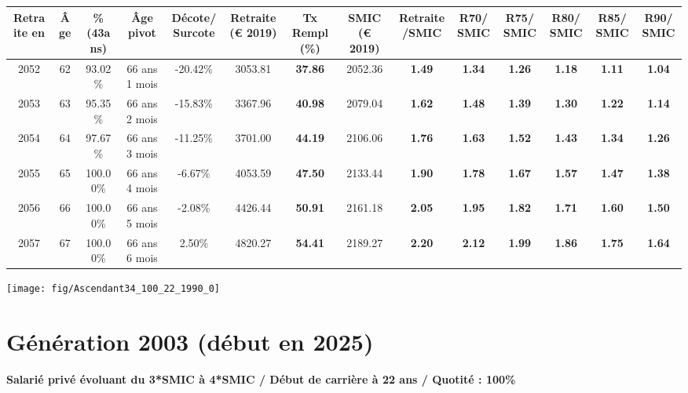 \begin{adjustbox}{max width=\textwidth} 
\begin{tabular}[htb]{|c|c||c|c|c||c|c||c|c||c|c|c|c|c|} 
\hline 
 Retraite en &  Âge &  \%(43ans) &  Âge pivot &  Décote/Surcote &  Retraite (\euro{} 2019) &  Tx Rempl(\%) &  SMIC (\euro{} 2019) &  Retraite/SMIC &  R70/SMIC &  R75/SMIC &  R80/SMIC &  R85/SMIC &  R90/SMIC \\ 
\hline \hline 
 2052 &  62 &  93.02\% &  66 ans 1 mois &  -20.42\% &  3053.81 &  {\bf 37.86} &  2052.36 &  {\bf 1.49} &  {\bf 1.34} &  {\bf 1.26} &  {\bf 1.18} &  {\bf 1.11} &  {\bf 1.04} \\ 
\hline 
 2053 &  63 &  95.35\% &  66 ans 2 mois &  -15.83\% &  3367.96 &  {\bf 40.98} &  2079.04 &  {\bf 1.62} &  {\bf 1.48} &  {\bf 1.39} &  {\bf 1.30} &  {\bf 1.22} &  {\bf 1.14} \\ 
\hline 
 2054 &  64 &  97.67\% &  66 ans 3 mois &  -11.25\% &  3701.00 &  {\bf 44.19} &  2106.06 &  {\bf 1.76} &  {\bf 1.63} &  {\bf 1.52} &  {\bf 1.43} &  {\bf 1.34} &  {\bf 1.26} \\ 
\hline 
 2055 &  65 &  100.00\% &  66 ans 4 mois &  -6.67\% &  4053.59 &  {\bf 47.50} &  2133.44 &  {\bf 1.90} &  {\bf 1.78} &  {\bf 1.67} &  {\bf 1.57} &  {\bf 1.47} &  {\bf 1.38} \\ 
\hline 
 2056 &  66 &  100.00\% &  66 ans 5 mois &  -2.08\% &  4426.44 &  {\bf 50.91} &  2161.18 &  {\bf 2.05} &  {\bf 1.95} &  {\bf 1.82} &  {\bf 1.71} &  {\bf 1.60} &  {\bf 1.50} \\ 
\hline 
 2057 &  67 &  100.00\% &  66 ans 6 mois &  2.50\% &  4820.27 &  {\bf 54.41} &  2189.27 &  {\bf 2.20} &  {\bf 2.12} &  {\bf 1.99} &  {\bf 1.86} &  {\bf 1.75} &  {\bf 1.64} \\ 
\hline 
\hline 
\end{tabular} 
\end{adjustbox} 
 
 \vspace{0.1cm} 

 {\hspace{-2.2cm}\texttt{[image: fig/Ascendant34\_100\_22\_1990\_0]}} 

\newpage 
 
\section{Génération 2003 (début en 2025)\label{Ascendant34_100_22_2003_0}} 
 
{\bf \noindent Salarié privé évoluant du 3*SMIC à 4*SMIC / Début de carrière à 22 ans / Quotité : 100\%}  ~ 

